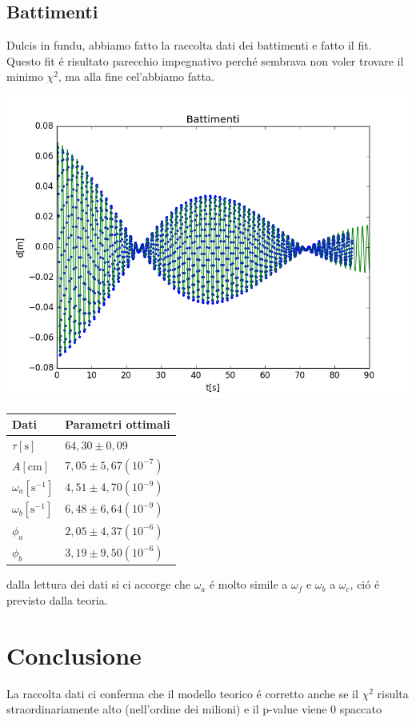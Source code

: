 \documentclass{exam}
\begin{document}
		\subsection {Battimenti}
			Dulcis in fundu, abbiamo fatto la raccolta dati dei battimenti e fatto il fit. Questo fit \'e risultato parecchio impegnativo perch\'e sembrava non voler trovare il minimo $\chi^2$, ma alla fine cel'abbiamo fatta.\\
			\begin{minipage}{0.5\textwidth}
				\includegraphics[width=\textwidth]{Battimenti}
				\end{minipage}
			\begin{minipage}{0.5\textwidth}
				\begin{tabular}{ll}
					\toprule
					Dati & Parametri ottimali \\
					\midrule
					$\tau[\textrm{s}]$ & $64,30 \pm 0,09$ \\
					$A[\textrm{cm}]$ & $7,05 \pm 5,67(10^{-7})$\\
					$\omega_{a}[\textrm{s}^{-1}]$ & $4,51 \pm 4,70(10^{-9})$\\
					$\omega_{b}[\textrm{s}^{-1}]$ & $6,48 \pm 6,64(10^{-9})$\\			
					$\phi_{a}$ & $2,05 \pm 4,37(10^{-6})$\\
					$\phi_{b}$ & $3,19 \pm 9,50(10^{-6})$\\
					\bottomrule
				\end{tabular}
			\end{minipage}
			dalla lettura dei dati si ci accorge che $\omega_{a}$ \'e molto simile a $\omega_{f}$ e $\omega_{b}$ a $\omega_{c}$, ci\'o \'e previsto dalla teoria.
	\section{Conclusione}
		La raccolta dati ci conferma che il modello teorico \'e corretto anche se il $\chi^2$ risulta straordinariamente alto (nell'ordine dei milioni) e il p-value viene 0 spaccato
\end{document}
